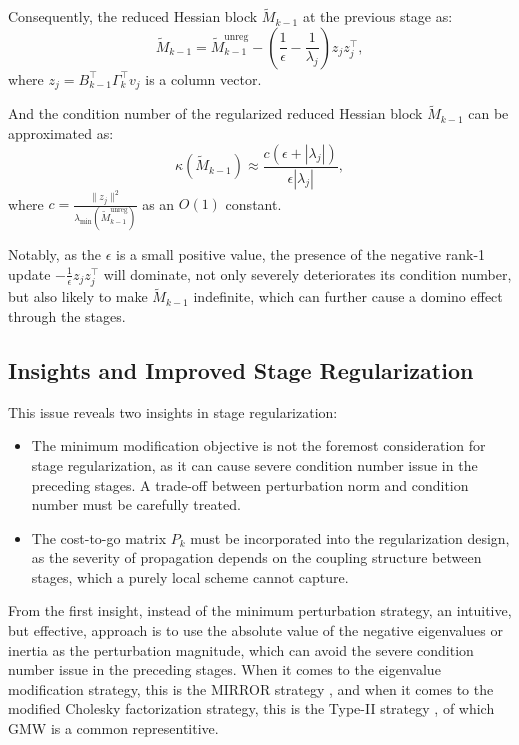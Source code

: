\documentclass[class=scrbook, crop=false]{standalone}
\begin{document}
Consequently, the reduced Hessian block $\tilde{M}_{k-1}$ at the previous stage as:
\begin{equation}
    \tilde{M}_{k-1} = \tilde{M}_{k-1}^{\mathrm{unreg}} - (\frac{1}{\epsilon} - \frac{1}{\lambda_j}) z_j z_j^\top,
\end{equation}
where $z_j = B_{k-1}^\top \Gamma_k^\top v_j$ is a column vector.

And the condition number of the regularized reduced Hessian block $\tilde{M}_{k-1}$ can be approximated as:
\begin{equation}
    \kappa(\tilde{M}_{k-1}) \approx \frac{c (\epsilon + |\lambda_j|)}{\epsilon |\lambda_j|},
\end{equation}
where $c = \frac{\|z_j\|^2}{\lambda_{\min}(\tilde{M}_{k-1}^{\mathrm{unreg}})}$ as an $O(1)$ constant.

Notably, as the $\epsilon$ is a small positive value,
the presence of the negative rank-1 update $-\frac{1}{\epsilon} z_j z_j^\top$ will dominate, not only severely deteriorates its condition number,
but also likely to make $\tilde{M}_{k-1}$ indefinite, which can further cause a domino effect through the stages.

\subsection{Insights and Improved Stage Regularization}
This issue reveals two insights in stage regularization:
\begin{itemize}
    \item The minimum modification objective \cite{fangModifiedCholeskyAlgorithms2007} is not the foremost consideration for stage regularization, 
    as it can cause severe condition number issue in the preceding stages.
    A trade-off between perturbation norm and condition number must be carefully treated.
    \item The cost-to-go matrix $P_k$ must be incorporated into the regularization design, 
    as the severity of propagation depends on the coupling structure between stages, 
    which a purely local scheme cannot capture.
\end{itemize}

From the first insight, instead of the minimum perturbation strategy,
an intuitive, but effective, approach is to use the absolute value of the negative eigenvalues or inertia as the perturbation magnitude,
which can avoid the severe condition number issue in the preceding stages.
When it comes to the eigenvalue modification strategy, this is the MIRROR strategy \cite{verschueren2017sparsity},
and when it comes to the modified Cholesky factorization strategy, this is the Type-II strategy \cite{fangModifiedCholeskyAlgorithms2007}, of which GMW is a common representitive.
\end{document}
